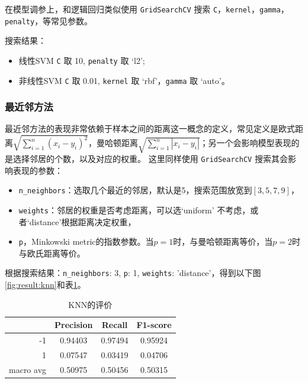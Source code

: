 \documentclass[a4paper]{article}
\begin{document}
在模型调参上，和逻辑回归类似使用 \texttt{GridSearchCV} 搜索 \texttt{C}，\texttt{kernel}，\texttt{gamma}，\texttt{penalty}，等常见参数。

搜索结果：
\begin{itemize}
    \item 线性SVM \texttt{C} 取 10, \texttt{penalty} 取 `l2';
    \item 非线性SVM \texttt{C} 取 0.01, \texttt{kernel} 取 `rbf'，\texttt{gamma} 取 `auto'。

\end{itemize}

\subsubsection{最近邻方法}

最近邻方法的表现非常依赖于样本之间的距离这一概念的定义，常见定义是欧式距离$\sqrt{\sum_{i=1}^{n}{(x_{i}-y_{i})^{2}}}$，曼哈顿距离$\sqrt{\sum_{i=1}^{n}{|x_{i}-y_{i}|}}$；另一个会影响模型表现的是选择邻居的个数，以及对应的权重。
这里同样使用 \texttt{GridSearchCV} 搜索其会影响表现的参数：
\begin{itemize}
    \item \texttt{n\_neighbors}：选取几个最近的邻居，默认是5，搜索范围放宽到$[3, 5, 7, 9]$，
    \item \texttt{weights}：邻居的权重是否考虑距离，可以选`uniform' 不考虑，或者`distance'根据距离决定权重，
    \item \texttt{p}，Minkowski metric的指数参数。当$p=1$时，与曼哈顿距离等价，当$p=2$时与欧氏距离等价。
\end{itemize}

根据搜索结果：\texttt{n\_neighbors}: 3, \texttt{p}: 1, \texttt{weights}: 'distance'，得到以下图\ref{fig:result:knn}和表\ref{tb:knn}。

\begin{table}[!h]
    \centering
    \renewcommand{\arraystretch}{1.5}
    \begin{tabular}{|r|c|c|c|}
        \hline
                  & Precision & Recall & F1-score \\ \hline
        -1        &     0.94403     &     0.97494   &    0.95924      \\ \hline
        1         &     0.07547      &     0.03419   &   0.04706       \\ \hline
        macro avg &      0.50975     &     0.50456   &    0.50315      \\ \hline
    \end{tabular}
    \caption{KNN的评价}
    \label{tb:knn}
\end{table}
\end{document}
